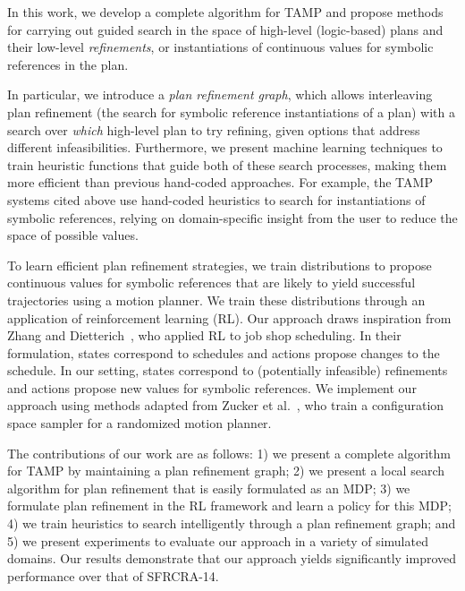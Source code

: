 In this work, we develop a complete algorithm for TAMP and propose
methods for carrying out guided search in the space of
high-level (logic-based) plans and their low-level
\emph{refinements}, or instantiations of continuous values for
symbolic references in the plan.

In particular, we introduce
a \emph{plan refinement graph}, which allows interleaving plan
refinement (the search for symbolic reference instantiations of a plan) with a
search over \emph{which} high-level plan to try refining, given options
that address different infeasibilities. Furthermore, we present
machine learning techniques to train heuristic functions that guide
both of these search processes, making them more efficient than previous
hand-coded approaches. For example, the TAMP systems cited above use hand-coded heuristics to
search for instantiations of symbolic references, relying
on domain-specific insight from the user to reduce the space of possible values.

To learn efficient plan refinement strategies, we train distributions
to propose continuous values for symbolic references that are likely to yield
successful trajectories using a motion planner. We train these distributions through an
application of reinforcement learning (RL). Our approach draws inspiration
from Zhang and Dietterich~\cite{JobShopSched}, who applied RL to job
shop scheduling. In their formulation, states correspond to schedules
and actions propose changes to the schedule. In our setting, states
correspond to (potentially infeasible) refinements and actions propose
new values for symbolic references. We implement our approach using methods
adapted from Zucker et al.~\cite{workspacebias}, who train a
configuration space sampler for a randomized motion planner.

The contributions of our work are as follows: 1) we present a complete
algorithm for TAMP by maintaining a plan refinement graph; 2) we
present a local search algorithm for plan refinement that is easily
formulated as an MDP; 3) we formulate plan refinement in the RL
framework and learn a policy for this MDP; 4) we train heuristics to
search intelligently through a plan refinement graph; and 5) we
present experiments to evaluate our approach in a variety of simulated
domains. Our results demonstrate that our approach yields
significantly improved performance over that of SFRCRA-14.
